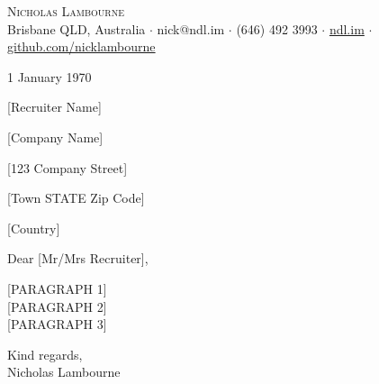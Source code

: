 \documentclass[a4paper]{scrlttr2}
\begin{document}
\vspace*{-50pt}

\begin{center}
	{\Huge \scshape {Nicholas Lambourne}}\\
	\vspace{3pt}
	\small Brisbane QLD, Australia $\cdot$ nick@ndl.im $\cdot$ (646) 492 3993 $\cdot$ \href{https://ndl.im}{ndl.im} $\cdot$ \href{https://github.com/nicklambourne}{github.com/nicklambourne}\\
	\hrulefill
\end{center}

\vspace{30pt}

1 January 1970

\vspace{40pt}

[Recruiter Name]

[Company Name]

[123 Company Street]

[Town STATE Zip Code]

[Country]

\vspace{40pt}

Dear [Mr/Mrs Recruiter],

\vspace{40pt}

[PARAGRAPH 1] \\

[PARAGRAPH 2] \\

[PARAGRAPH 3]

\vspace{40pt}

Kind regards, \\

Nicholas Lambourne
\end{document}
